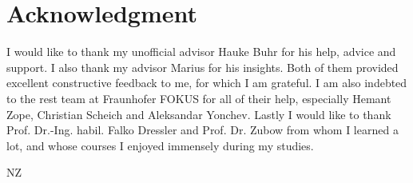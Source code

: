 
\cleardoublepage
{}
\section*{Acknowledgment}

I would like to thank my unofficial advisor Hauke Buhr for his help, advice and support. I also thank my advisor Marius for his insights. Both of them provided excellent constructive feedback to me, for which I am grateful. I am also indebted to the rest team at Fraunhofer FOKUS for all of their help, especially Hemant Zope, Christian Scheich and Aleksandar Yonchev. Lastly I would like to thank Prof. Dr.-Ing. habil. Falko Dressler and Prof. Dr. Zubow from whom I learned a lot, and whose courses I enjoyed immensely during my studies.

\begin{flushright}
NZ\\[1pc]
\end{flushright}
